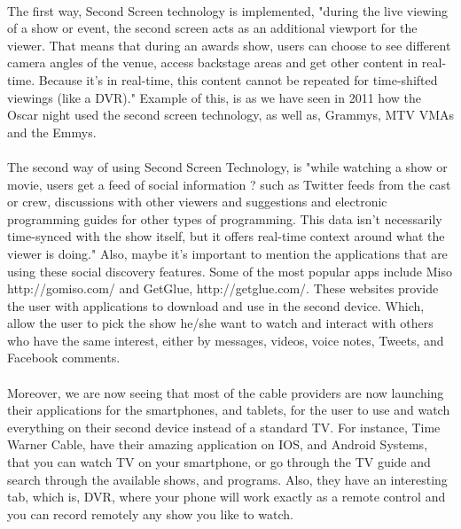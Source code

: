 \documentclass[12pt, oneside]{article}   	%
\begin{document}
\paragraph{}
The first way, Second Screen technology is implemented, "during the live viewing of a show or event, the second screen acts as an additional viewport for the viewer. That means that during an awards show, users can choose to see different camera angles of the venue, access backstage areas and get other content in real-time. Because it's in real-time, this content cannot be repeated for time-shifted viewings (like a DVR)."\cite{Second-Screen-His} Example of this, is as we have seen in 2011 how the Oscar night used the second screen technology, as well as, Grammys, MTV VMAs and the Emmys.\cite{Second-Screen-His}
\paragraph{}
 The second way of using Second Screen Technology, is "while watching a show or movie, users get a feed of social information ? such as Twitter feeds from the cast or crew, discussions with other viewers and suggestions and electronic programming guides for other types of programming. This data isn't necessarily time-synced with the show itself, but it offers real-time context around what the viewer is doing."\cite{Second-Screen-His} Also, maybe it's important to mention the applications that are using these social discovery features. Some of the most popular apps include Miso http://gomiso.com/ and GetGlue, http://getglue.com/. \cite{Second-Screen-Art} These websites provide the user with applications to download and use in the second device.  Which, allow the user to pick the show he/she want to watch and interact with others who have the same interest, either by messages, videos, voice notes, Tweets, and Facebook comments.
 \paragraph{}
Moreover, we are now seeing that most of the cable providers are now launching their applications for the smartphones, and tablets, for the user to use and watch everything on their second device instead of a standard TV.  For instance, Time Warner Cable, have their amazing application on IOS, and Android Systems, that you can watch TV on your smartphone, or go through the TV guide and search through the available shows, and programs.  Also, they have an interesting tab, which is, DVR, where your phone will work exactly as a remote control and you can record remotely any show you like to watch.  
\end{document}
